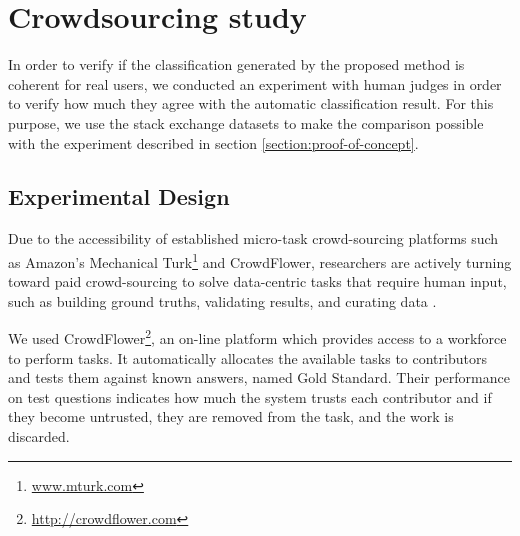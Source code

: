 \begin{displayquote}
\end{displayquote}

\section{\hspace*{3pt} Crowdsourcing study}

In order to verify if the classification generated by the proposed method is coherent for real users, we conducted an experiment with human judges in order to verify how much they agree with the automatic classification result. For this purpose, we use the stack exchange datasets to make the comparison possible with the experiment described in section \ref{section:proof-of-concept}.



\subsection{\hspace*{3pt} Experimental Design}

Due to the accessibility of established micro-task crowd-sourcing platforms such as Amazon’s Mechanical Turk\footnote{\url{www.mturk.com}} and CrowdFlower, researchers are actively turning toward paid crowd-sourcing to solve data-centric tasks that require human input, such as building ground truths, validating results, and curating data \cite{7156008}.

We used CrowdFlower\footnote{\url{http://crowdflower.com}}, an on-line platform which provides access to a workforce to perform tasks.  It automatically allocates the available tasks to contributors and tests them against known answers, named Gold Standard. Their performance on test questions indicates how much the system trusts each contributor and if they become untrusted, they are removed from the task, and the work is discarded.

